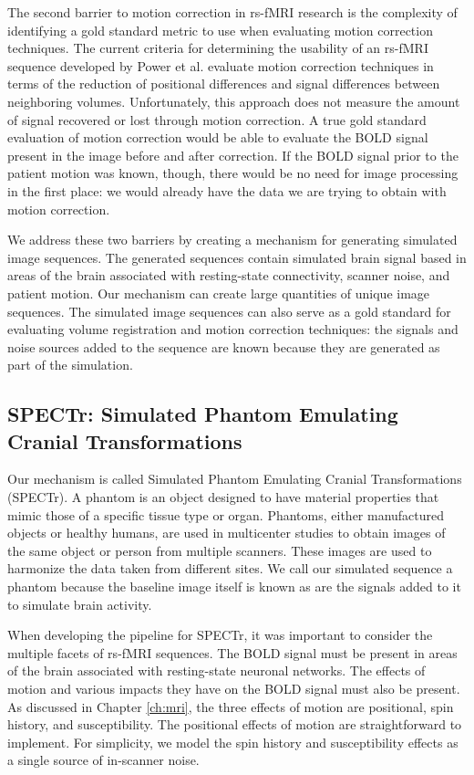 The second barrier to motion correction in rs-fMRI research is the complexity of identifying a gold standard metric to use when evaluating motion correction techniques. The current criteria for determining the usability of an rs-fMRI sequence developed by Power et al. evaluate motion correction techniques in terms of the reduction of positional differences and signal differences between neighboring volumes. Unfortunately, this approach does not measure the amount of signal recovered or lost through motion correction. A true gold standard evaluation of motion correction would be able to evaluate the BOLD signal present in the image before and after correction. If the BOLD signal prior to the patient motion was known, though, there would be no need for image processing in the first place: we would already have the data we are trying to obtain with motion correction.

We address these two barriers by creating a mechanism for generating simulated image sequences. The generated sequences contain simulated brain signal based in areas of the brain associated with resting-state connectivity, scanner noise, and patient motion. Our mechanism can create large quantities of unique image sequences. The simulated image sequences can also serve as a gold standard for evaluating volume registration and motion correction techniques: the signals and noise sources added to the sequence are known because they are generated as part of the simulation.

\subsection{SPECTr: Simulated Phantom Emulating Cranial Transformations}

Our mechanism is called Simulated Phantom Emulating Cranial Transformations (SPECTr). A phantom is an object designed to have material properties that mimic those of a specific tissue type or organ. Phantoms, either manufactured objects or healthy humans, are used in multicenter studies to obtain images of the same object or person from multiple scanners. These images are used to harmonize the data taken from different sites. We call our simulated sequence a phantom because the baseline image itself is known as are the signals added to it to simulate brain activity. 

When developing the pipeline for SPECTr, it was important to consider the multiple facets of rs-fMRI sequences. The BOLD signal must be present in areas of the brain associated with resting-state neuronal networks. The effects of motion and various impacts they have on the BOLD signal must also be present. As discussed in Chapter \ref{ch:mri}, the three effects of motion are positional, spin history, and susceptibility. The positional effects of motion are straightforward to implement. For simplicity, we model the spin history and susceptibility effects as a single source of in-scanner noise. 

